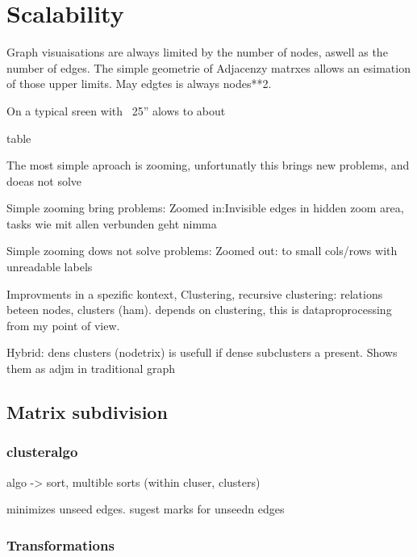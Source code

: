%
%
% 
% 
% 


\chapter{Scalability}

\label{chap:Scalability}


Graph visuaisations are always limited by the number of nodes, aswell as the number of edges. 
The simple geometrie of Adjacenzy matrxes allows an esimation of those upper limits. May edgtes is always nodes**2.

On a typical sreen with ~25” alows to  about 

table

The most simple
 aproach is zooming, unfortunatly this brings new problems, and doeas not solve

Simple zooming bring problems:
Zoomed in:Invisible edges in hidden zoom area, tasks wie mit allen verbunden geht nimma

Simple zooming dows not solve problems:
Zoomed out: to small cols/rows with unreadable labels

Improvments in a spezific kontext, 
Clustering, recursive clustering: relations beteen nodes, clusters (ham). depends on clustering, this is dataproprocessing from my point of view.

Hybrid: dens clusters (nodetrix) is usefull if dense subclusters a present. Shows them as adjm in traditional graph



\section{Matrix subdivision}

\subsection{clusteralgo}
algo -> sort,
multible sorts (within cluser, clusters)

minimizes unseed edges. sugest marks for unseedn edges

\subsection{Transformations}

